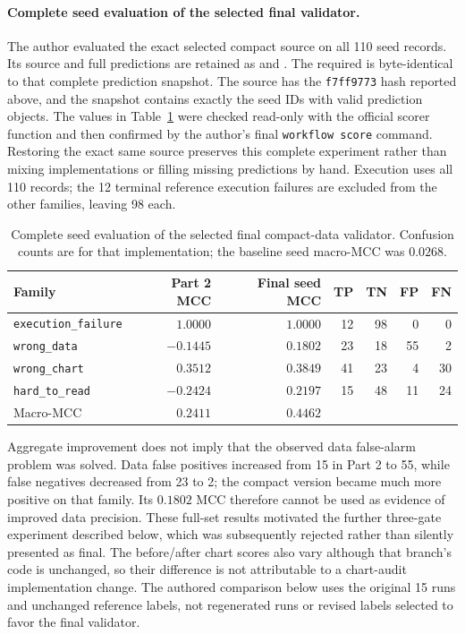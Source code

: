 \documentclass[11pt]{article}
\begin{document}
\paragraph{Complete seed evaluation of the selected final validator.}
The author evaluated the exact selected compact source on all 110 seed
records. Its source and full predictions are retained as
 and
.
The required  is byte-identical
to that complete prediction snapshot.
The source has the \texttt{f7ff9773} hash reported above, and the snapshot
contains exactly the seed IDs with valid prediction objects. The values
in Table~\ref{tab:part4-compact-full} were checked read-only with the
official scorer function and then confirmed by the author's final
\texttt{workflow score} command. Restoring the exact same source
preserves this complete experiment rather than mixing implementations
or filling missing predictions by hand.
Execution uses all 110 records; the 12 terminal reference execution
failures are excluded from the other families, leaving 98 each.

\begin{table}[htbp]
\centering
\small
\begin{tabular}{lrrrrrr}
\toprule
Family & Part 2 MCC & Final seed MCC & TP & TN & FP & FN \\
\midrule
\texttt{execution\_failure} & $1.0000$ & $1.0000$ & 12 & 98 & 0 & 0 \\
\texttt{wrong\_data} & $-0.1445$ & $0.1802$ & 23 & 18 & 55 & 2 \\
\texttt{wrong\_chart} & $0.3512$ & $0.3849$ & 41 & 23 & 4 & 30 \\
\texttt{hard\_to\_read} & $-0.2424$ & $0.2197$ & 15 & 48 & 11 & 24 \\
\midrule
Macro-MCC & $0.2411$ & $0.4462$ & & & & \\
\bottomrule
\end{tabular}
\caption{Complete seed evaluation of the selected final compact-data
validator. Confusion counts are for that implementation; the baseline
seed macro-MCC was $0.0268$.}
\label{tab:part4-compact-full}
\end{table}

Aggregate improvement does not imply that the observed data false-alarm
problem was solved. Data false positives increased from 15 in Part 2 to
55, while false negatives decreased from 23 to 2; the compact version
became much more positive on that family. Its $0.1802$ MCC therefore
cannot be used as evidence of improved data precision. These full-set
results motivated the further three-gate experiment described below,
which was subsequently rejected rather than silently presented as final.
The before/after chart scores also vary although that branch's code is
unchanged, so their difference is not attributable to a chart-audit
implementation change. The authored comparison below uses the original
15 runs and unchanged reference labels, not regenerated runs or revised
labels selected to favor the final validator.
\end{document}
